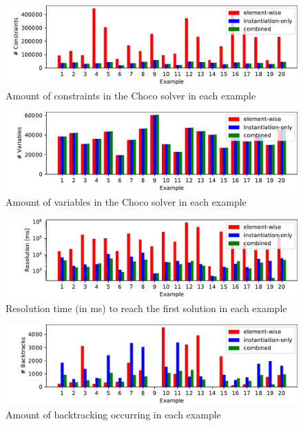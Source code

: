 \documentclass[conference]{IEEEtran}
\begin{document}
\begin{figure}[h!tbp]
\centering
\includegraphics[width=.8\textwidth]{results-constraint-count}
\caption{Amount of constraints in the Choco solver in each example}
\label{results-constraints-count}
\end{figure}

\begin{figure}[h!tbp]
  \centering
  \includegraphics[width=.8\textwidth]{results-variables-count}
  \caption{Amount of variables in the Choco solver in each example}
  \label{results-variables-count}
\end{figure}

\begin{figure}[h!tbp]
  \centering
  \includegraphics[width=.8\textwidth]{results-resolution}
  \caption{Resolution time (in ms) to reach the first solution in each example}
  \label{results-resolution}
\end{figure}

\begin{figure}[h!tbp]
\centering
\includegraphics[width=.8\textwidth]{results-backtracks}
\caption{Amount of backtracking occurring in each example}
\label{results-backtracks}
\end{figure}
\end{document}
